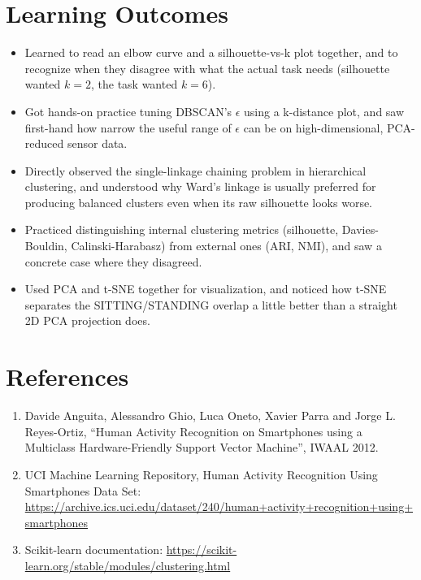 \documentclass[12pt,a4paper]{article}
\begin{document}
\section{Learning Outcomes}
\begin{itemize}
\item Learned to read an elbow curve and a silhouette-vs-k plot together, and to recognize when they
disagree with what the actual task needs (silhouette wanted $k=2$, the task wanted $k=6$).
\item Got hands-on practice tuning DBSCAN's $\epsilon$ using a k-distance plot, and saw first-hand how
narrow the useful range of $\epsilon$ can be on high-dimensional, PCA-reduced sensor data.
\item Directly observed the single-linkage chaining problem in hierarchical clustering, and understood
why Ward's linkage is usually preferred for producing balanced clusters even when its raw silhouette
looks worse.
\item Practiced distinguishing internal clustering metrics (silhouette, Davies-Bouldin,
Calinski-Harabasz) from external ones (ARI, NMI), and saw a concrete case where they disagreed.
\item Used PCA and t-SNE together for visualization, and noticed how t-SNE separates the
SITTING/STANDING overlap a little better than a straight 2D PCA projection does.
\end{itemize}

\section{References}
\begin{enumerate}
\item Davide Anguita, Alessandro Ghio, Luca Oneto, Xavier Parra and Jorge L. Reyes-Ortiz, ``Human
Activity Recognition on Smartphones using a Multiclass Hardware-Friendly Support Vector Machine'',
IWAAL 2012.
\item UCI Machine Learning Repository, Human Activity Recognition Using Smartphones Data Set:
\url{https://archive.ics.uci.edu/dataset/240/human+activity+recognition+using+smartphones}
\item Scikit-learn documentation: \url{https://scikit-learn.org/stable/modules/clustering.html}
\end{enumerate}
\end{document}
